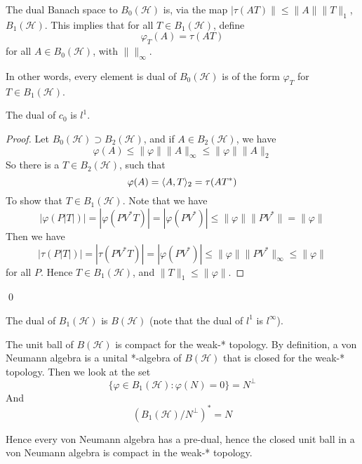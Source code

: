 \begin{theorem}
    The dual Banach space to $B_0(\mathcal{H})$ is, via the map $|\tau(AT)\|\leq \|A\|\|T\|_1$, $B_1(\mathcal{H})$. This implies that for all $T\in B_1(\mathcal{H})$, define 
    \begin{equation*}
        \varphi_T(A)=\tau(AT)
    \end{equation*}
    for all $A\in B_0(\mathcal{H})$, with $\| \|_\infty$.

    In other words, every element is dual of $B_0(\mathcal{H})$ is of the form $\varphi_T$ for $T\in B_1(\mathcal{H})$.
\end{theorem}
\begin{remark}
    The dual of $c_0$ is $l^1$.    
\end{remark}
\begin{proof}
    Let $B_0(\mathcal{H})\supset B_2(\mathcal{H})$, and if $A\in B_2(\mathcal{H})$, we have 
    \begin{equation*}
        \varphi(A)\leq\|\varphi\|\|A\|_\infty\leq\|\varphi\|\|A\|_2
    \end{equation*}
So there is a $T\in B_2(\mathcal{H})$, such that 
\begin{equation*}
    \varphi(A)=\langle A, T\rangle_2=\tau(AT^*)
\end{equation*}
To show that $T\in B_1(\mathcal{H})$. Note that we have 
\begin{equation*}
    |\varphi(P|T|)|=|\varphi(PV^*T)|=|\varphi(PV^*)|\leq \|\varphi\|\|PV^*\|=\|\varphi\|
\end{equation*}
Then we have 
\begin{equation*}
    |\tau(P|T|)|=|\tau(PV^*T)|=|\varphi(PV^*)|\leq\|\varphi\|\|PV^*\|_\infty\leq\|\varphi\|
\end{equation*}
for all $P$. Hence $T\in B_1(\mathcal{H})$, and $\|T\|_1\leq\|\varphi\|$.
\end{proof}
\qed

\begin{theorem}
    The dual of $B_1(\mathcal{H})$ is $B(\mathcal{H})$ (note that the dual of $l^1$ is $l^\infty$).
\end{theorem}
\begin{corollary}
    The unit ball of $B(\mathcal{H})$ is compact for the weak-* topology. By definition, a von Neumann algebra is a unital *-algebra of $B(\mathcal{H})$ that is closed for the weak-* topology. Then we look at the set
    \begin{equation*}
        \{\varphi\in B_1(\mathcal{H}):\varphi(N)=0\}=N^\perp
    \end{equation*}
    And 
    \begin{equation*}
        \left( B_1(\mathcal{H})/N^\perp\right)^*=N
    \end{equation*}
\end{corollary}
Hence every von Neumann algebra has a pre-dual, hence the closed unit ball in a von Neumann algebra is compact in the weak-* topology.

